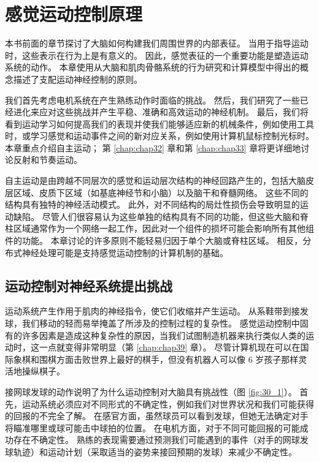 \chapter{感觉运动控制原理} \label{chap:chap30}

本书前面的章节探讨了大脑如何构建我们周围世界的内部表征。 当用于指导运动时，这些表示在行为上是有意义的。 因此，感觉表征的一个重要功能是塑造运动系统的动作。 本章使用从大脑和肌肉骨骼系统的行为研究和计算模型中得出的概念描述了支配运动神经控制的原则。

我们首先考虑电机系统在产生熟练动作时面临的挑战。 然后，我们研究了一些已经进化来应对这些挑战并产生平稳、准确和高效运动的神经机制。 最后，我们将看到运动学习如何提高我们的表现并使我们能够适应新的机械条件，例如使用工具时，或学习感觉和运动事件之间的新对应关系，例如使用计算机鼠标控制光标时。 本章重点介绍自主运动； 第 \ref{chap:chap32} 章和第 \ref{chap:chap33} 章将更详细地讨论反射和节奏运动。

自主运动是由跨越不同层次的感觉和运动层次结构的神经回路产生的，包括大脑皮层区域、皮质下区域（如基底神经节和小脑）以及脑干和脊髓网络。 这些不同的结构具有独特的神经活动模式。 此外，对不同结构的局灶性损伤会导致明显的运动缺陷。 尽管人们很容易认为这些单独的结构具有不同的功能，但这些大脑和脊柱区域通常作为一个网络一起工作，因此对一个组件的损坏可能会影响所有其他组件的功能。 本章讨论的许多原则不能轻易归因于单个大脑或脊柱区域。 相反，分布式神经处理可能是支持感觉运动控制的计算机制的基础。

\section{运动控制对神经系统提出挑战}

运动系统产生作用于肌肉的神经指令，使它们收缩并产生运动。 从系鞋带到接发球，我们移动的轻而易举掩盖了所涉及的控制过程的复杂性。 感觉运动控制中固有的许多因素是造成这种复杂性的原因，当我们试图制造机器来执行类似人类的运动时，这一点就变得非常明显（第 \ref{chap:chap39} 章）。 尽管计算机现在可以在国际象棋和围棋方面击败世界上最好的棋手，但没有机器人可以像 6 岁孩子那样灵活地操纵棋子。

接网球发球的动作说明了为什么运动控制对大脑具有挑战性（图 \ref{fig:30_1}）。
首先，运动系统必须应对不同形式的不确定性，例如我们对世界状况和我们可能获得的回报的不完全了解。 在感官方面，虽然球员可以看到发球，但她无法确定对手将瞄准哪里或球可能击中球拍的位置。 在电机方面，对于不同可能回报的可能成功存在不确定性。 熟练的表现需要通过预测我们可能遇到的事件（对手的网球发球轨迹）和运动计划（采取适当的姿势来接回预期的发球）来减少不确定性。

